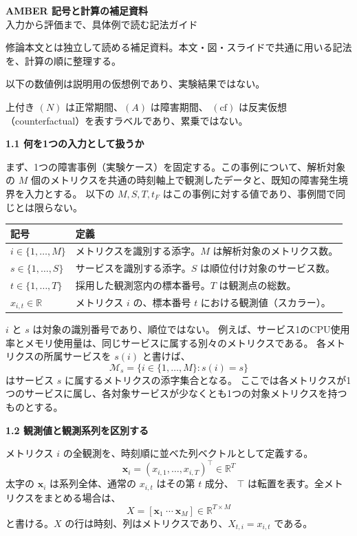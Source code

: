\documentclass[uplatex,dvipdfmx,fontsize=11pt,baselineskip=17pt,paper=a4]{jlreq}
\newcommand{\head}[1]{\par\bigskip\noindent{\large\bfseries #1}\par\smallskip}
\begin{document}
\begin{center}
{\LARGE\bfseries AMBER 記号と計算の補足資料}\\[3pt]
入力から評価まで、具体例で読む記法ガイド
\end{center}
修論本文とは独立して読める補足資料。本文・図・スライドで共通に用いる記法を、計算の順に整理する。

以下の数値例は説明用の仮想例であり、実験結果ではない。

上付き $(N)$ は正常期間、$(A)$ は障害期間、
$(\mathrm{cf})$ は反実仮想（counterfactual）を表すラベルであり、累乗ではない。

\head{1. 添字と入力系列}
\textbf{1.1 何を1つの入力として扱うか}

まず、1つの障害事例（実験ケース）を固定する。この事例について、解析対象の
$M$ 個のメトリクスを共通の時刻軸上で観測したデータと、既知の障害発生境界を入力とする。
以下の $M,S,T,t_F$ はこの事例に対する値であり、事例間で同じとは限らない。

\begin{tabular}{@{}p{38mm}p{132mm}@{}}
\toprule
記号 & 定義 \\
\midrule
$i\in\{1,\ldots,M\}$ & メトリクスを識別する添字。$M$ は解析対象のメトリクス数。\\
$s\in\{1,\ldots,S\}$ & サービスを識別する添字。$S$ は順位付け対象のサービス数。\\
$t\in\{1,\ldots,T\}$ & 採用した観測窓内の標本番号。$T$ は観測点の総数。\\
$x_{i,t}\in\mathbb R$ & メトリクス $i$ の、標本番号 $t$ における観測値（スカラー）。\\
\bottomrule
\end{tabular}

$i$ と $s$ は対象の識別番号であり、順位ではない。
例えば、サービス1のCPU使用率とメモリ使用量は、同じサービスに属する別々のメトリクスである。
各メトリクスの所属サービスを $s(i)$ と書けば、
\[
\mathcal M_s=\{i\in\{1,\ldots,M\}:s(i)=s\}
\]
はサービス $s$ に属するメトリクスの添字集合となる。
ここでは各メトリクスが1つのサービスに属し、各対象サービスが少なくとも1つの対象メトリクスを持つものとする。

\textbf{1.2 観測値と観測系列を区別する}

メトリクス $i$ の全観測を、時刻順に並べた列ベクトルとして定義する。
\[
\boxed{\mathbf{x}_i=(x_{i,1},\ldots,x_{i,T})^\top\in\mathbb R^T}
\]
太字の $\mathbf{x}_i$ は系列全体、通常の $x_{i,t}$ はその第 $t$ 成分、
$\top$ は転置を表す。全メトリクスをまとめる場合は、
\[
X=[\mathbf{x}_1\ \cdots\ \mathbf{x}_M]\in\mathbb R^{T\times M}
\]
と書ける。$X$ の行は時刻、列はメトリクスであり、$X_{t,i}=x_{i,t}$ である。
\end{document}
